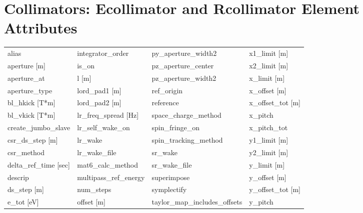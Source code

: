  \section{Collimators: Ecollimator and Rcollimator Element Attributes}
 \label{s:list.collimator}
 
 \begin{tabular}{llll} \toprule
alias                            & integrator_order                 & py_aperture_width2               & x1_limit [m]                     \\
aperture [m]                     & is_on                            & pz_aperture_center               & x2_limit [m]                     \\
aperture_at                      & l [m]                            & pz_aperture_width2               & x_limit [m]                      \\
aperture_type                    & lord_pad1 [m]                    & ref_origin                       & x_offset [m]                     \\
bl_hkick [T*m]                   & lord_pad2 [m]                    & reference                        & x_offset_tot [m]                 \\
bl_vkick [T*m]                   & lr_freq_spread [Hz]              & space_charge_method              & x_pitch                          \\
create_jumbo_slave               & lr_self_wake_on                  & spin_fringe_on                   & x_pitch_tot                      \\
csr_ds_step [m]                  & lr_wake                          & spin_tracking_method             & y1_limit [m]                     \\
csr_method                       & lr_wake_file                     & sr_wake                          & y2_limit [m]                     \\
delta_ref_time [sec]             & mat6_calc_method                 & sr_wake_file                     & y_limit [m]                      \\
descrip                          & multipass_ref_energy             & superimpose                      & y_offset [m]                     \\
ds_step [m]                      & num_steps                        & symplectify                      & y_offset_tot [m]                 \\
e_tot [eV]                       & offset [m]                       & taylor_map_includes_offsets      & y_pitch                          \\

\end{tabular}
